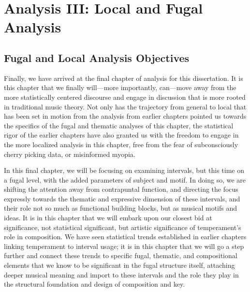     
    
    
    

    \hypertarget{Analysis III: Local and Fugal Analysis}{\chapter{Analysis III: Local and Fugal Analysis}\label{Analysis III: Local and Fugal Analysis}}


    \section{Fugal and Local Analysis
Objectives}\label{fugal-and-local-analysis-objectives}

    Finally, we have arrived at the final chapter of analysis for this
dissertation. It is this chapter that we finally will---more
importantly, can---move away from the more statistically centered
discourse and engage in discussion that is more rooted in traditional
music theory. Not only has the trajectory from general to local that has
been set in motion from the analysis from earlier chapters pointed us
towards the specifics of the fugal and thematic analyses of this
chapter, the statistical rigor of the earlier chapters have also granted
us with the freedom to engage in the more localized analysis in this
chapter, free from the fear of subconsciously cherry picking data, or
misinformed myopia.

In this final chapter, we will be focusing on examining intervals, but
this time on a fugal level, with the added parameters of subject and
motif. In doing so, we are shifting the attention away from contrapuntal
function, and directing the focus expressly towards the thematic and
expressive dimension of these intervals, and their role not so much as
functional building blocks, but as musical motifs and ideas. It is in
this chapter that we will embark upon our closest bid at significance,
not statistical significant, but artistic significance of temperament's
role in composition. We have seen statistical trends established in
earlier chapters linking temperament to interval usage; it is in this
chapter that we will go a step further and connect these trends to
specific fugal, thematic, and compositional elements that we know to be
significant in the fugal structure itself, attaching deeper musical
meaning and import to these intervals and the role they play in the
structural foundation and design of composition and key.

